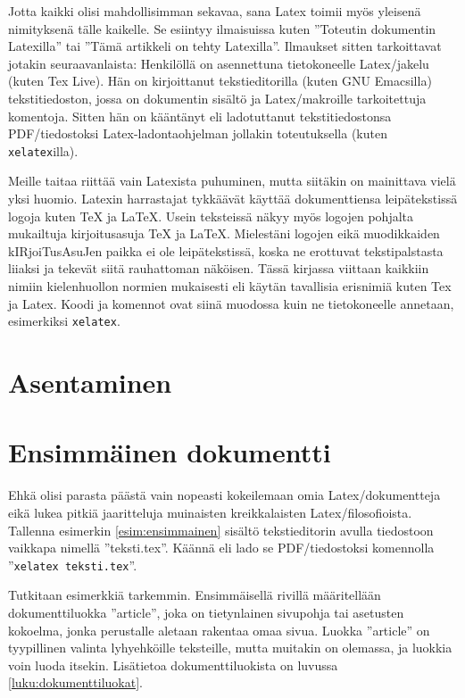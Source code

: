 \documentclass[a4paper,10pt,notitlepage,oneside]{book}
\newcommand{\koodi}[1]{\texttt{#1}}
\begin{document}
Jotta kaikki olisi mahdollisimman sekavaa, sana Latex toimii myös
yleisenä nimityksenä tälle kaikelle. Se esiintyy ilmaisuissa kuten
''Toteutin dokumentin Latexilla'' tai ''Tämä artikkeli on tehty
Latexilla''. Ilmaukset sitten tarkoittavat jotakin seuraavanlaista:
Henkilöllä on asennettuna tietokoneelle Latex\-/jakelu (kuten Tex Live).
Hän on kirjoittanut teksti\-editorilla (kuten GNU Emacsilla)
tekstitiedoston, jossa on dokumentin sisältö ja Latex\-/makroille
tarkoitettuja komentoja. Sitten hän on kääntänyt eli ladotuttanut
tekstitiedostonsa PDF\-/tiedostoksi Latex-la\-don\-ta\-oh\-jel\-man
jollakin toteutuksella (kuten \koodi{xelatex}illa).

Meille \marginpar{\Large\LaTeX} taitaa riittää vain Latexista puhuminen,
mutta siitäkin on mainittava vielä yksi huomio. Latexin harrastajat
tykkäävät käyttää dokumenttiensa leipätekstissä logoja kuten \TeX{} ja
\LaTeX{}. Usein teksteissä näkyy myös logojen pohjalta mukailtuja
kirjoitus\-asuja TeX ja LaTeX. Mielestäni logojen eikä muodikkaiden
kIRjoiTus\-AsuJen paikka ei ole leipätekstissä, koska ne erottuvat
tekstipalstasta liiaksi ja tekevät siitä rauhattoman näköisen. Tässä
kirjassa viittaan kaikkiin nimiin kielenhuollon normien mukaisesti eli
käytän tavallisia erisnimiä kuten Tex ja Latex. Koodi ja komennot ovat
siinä muodossa kuin ne tietokoneelle annetaan, esimerkiksi
\koodi{xelatex}.

\section{Asentaminen}
\label{luku:asentaminen}

\section{Ensimmäinen dokumentti}

Ehkä olisi parasta päästä vain nopeasti kokeilemaan omia
Latex\-/dokumentteja eikä lukea pitkiä jaaritteluja muinaisten
kreikkalaisten Latex\-/filosofioista. Tallenna esimerkin
\ref{esim:ensimmainen} sisältö teksti\-editorin avulla tiedostoon
vaikkapa nimellä ''teksti.tex''. Käännä eli lado se PDF\-/tiedostoksi
komennolla ''\koodi{xelatex teksti.tex}''.

Tutkitaan esimerkkiä tarkemmin. Ensimmäisellä rivillä määritellään
dokumenttiluokka ''\textenglish{article}'', joka on tietynlainen
sivupohja tai asetusten kokoelma, jonka perustalle aletaan rakentaa omaa
sivua. Luokka ''article'' on tyypillinen valinta lyhyehköille
teksteille, mutta muitakin on olemassa, ja luokkia voin luoda itsekin.
Lisätietoa dokumenttiluokista on luvussa \ref{luku:dokumenttiluokat}.
\end{document}

